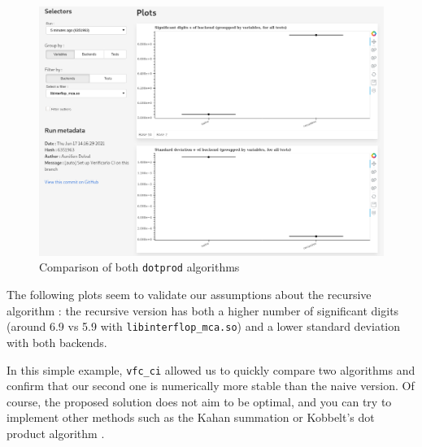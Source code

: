 \begin{figure}
\includegraphics[width=\textwidth]{images/naive_vs_recursive.png}
\caption{Comparison of both \texttt{dotprod} algorithms}
\label{naive_vs_recursive}
\end{figure}

The following plots seem to validate our assumptions about the recursive
algorithm : the recursive version has both a higher number of significant
digits (around 6.9 vs 5.9 with \texttt{libinterflop_mca.so}) and a
lower standard deviation with both backends.

\bigbreak

In this simple example, \texttt{vfc_ci} allowed us to quickly compare
two algorithms and confirm that our second one is numerically more stable than
the naive version. Of course, the proposed solution does not aim to be optimal,
and you can try to implement other methods such as the Kahan summation
\cite{kahan} or Kobbelt's dot product algorithm \cite{kobbelt}.

